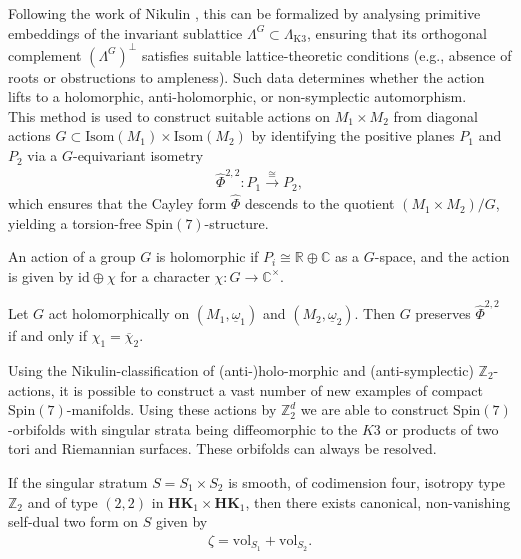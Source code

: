 \documentclass[psamsfonts]{amsart}
\theoremstyle{plain}
\theoremstyle{definition}{
\newtheorem{defi}{Definition}[section]
\newtheorem{ass}{Assumption}
\newtheorem*{nota}{Notation}}
\theoremstyle{remark}{
\newtheorem{rem}{Remark}
\newtheorem{ex}{Example}}
\theoremstyle{plain}{
\newtheorem{thm}{Theorem}[section]
\newtheorem{lem}{Lemma}[section]
\newtheorem{cor}{Corollary}[section]
\newtheorem{prop}{Proposition}[section]
\newtheorem{con}{Conjecture}[section]}
\newcommand{\m}[1]{{\mathrm{#1}}}
\newcommand{\cat}[1]{\textbf{#1}}
\begin{document}
Following the work of Nikulin \cite{nikulin1979finite,van2007nikulin}, this can be formalized by analysing primitive embeddings of the invariant sublattice $ \Lambda^G \subset \Lambda_{\m{K3}} $, ensuring that its orthogonal complement $ (\Lambda^G)^\perp $ satisfies suitable lattice-theoretic conditions (e.g., absence of roots or obstructions to ampleness). Such data determines whether the action lifts to a holomorphic, anti-holomorphic, or non-symplectic automorphism.\\

This method is used to construct suitable actions on $ M_1 \times M_2 $ from diagonal actions $ G \subset \m{Isom}(M_1)\times\m{Isom}(M_2) $ by identifying the positive planes $ P_1 $ and $ P_2 $ via a $ G $-equivariant isometry
\begin{align*}
    \hat{\Phi}^{2,2}\colon  P_1 \xrightarrow{\cong} P_2,
\end{align*}
which ensures that the Cayley form $ \hat{\Phi} $ descends to the quotient $ (M_1\times M_2)/G $, yielding a torsion-free $ \m{Spin}(7) $-structure.


\begin{defi}
    An action of a group $G$ is holomorphic if $P_i\cong\mathbb{R}\oplus\mathbb{C}$ as a $G$-space, and the action is given by $\m{id}\oplus\chi$ for a character $\chi\colon G\rightarrow \mathbb{C}^\times$.
\end{defi}

\begin{cor}
Let $G$ act holomorphically on $(M_1,\underline{\omega}_1)$ and $(M_2,\underline{\omega}_2)$. Then $G$ preserves $\hat{\Phi}^{2,2}$ if and only if $\chi_1=\overline{\chi}_2$.
\end{cor}

\begin{rem}
    Using the Nikulin-classification \cite{nikulin1979finite,van2007nikulin,huybrechts2016lectures} of (anti-)holo-morphic and (anti-symplectic) $\mathbb{Z}_2$-actions, it is possible to construct a vast number of new examples of compact $\m{Spin}(7)$-manifolds. Using these actions by $\mathbb{Z}_2^d$ we are able to construct $\m{Spin}(7)$-orbifolds with singular strata being diffeomorphic to the $K3$ or products of two tori and Riemannian surfaces. These orbifolds can always be resolved.
\end{rem}



\begin{rem}
    If the singular stratum $S=S_1\times S_2$ is smooth, of codimension four, isotropy type $\mathbb{Z}_2$ and of type $(2,2)$ in $\cat{HK}_1\times \cat{HK}_1$, then there exists canonical, non-vanishing self-dual two form on $S$ given by 
    \begin{align*}
        \zeta=\m{vol}_{S_1}+\m{vol}_{S_2}.
    \end{align*}
\end{rem}
\end{document}
